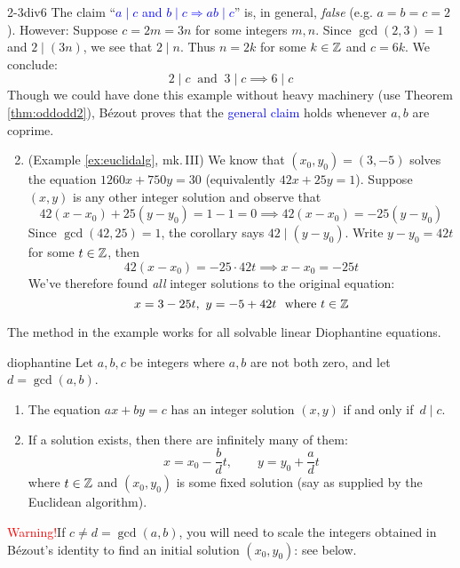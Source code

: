 \begin{examples}{}{2-3div6}
	\exstart The claim ``\textcolor{blue}{$a\mid c$ and $b\mid c\Longrightarrow ab\mid c$}'' is, in general, \emph{false} (e.g.{} $a=b=c=2$). However: Suppose $c=2m=3n$ for some integers $m,n$. Since $\gcd(2,3)=1$ and $2\mid(3n)$, we see that $2\mid n$. Thus $n=2k$ for some $k\in\mathbb{Z}$ and $c=6k$. We conclude:
	\[
		2\mid c\ \text{ and }\ 3\mid c\implies 6\mid c
	\]
	Though we could have done this example without heavy machinery (use Theorem \ref{thm:oddodd2}), Bézout proves that the \textcolor{blue}{general claim} holds whenever $a,b$ are coprime.
% 	 
	\begin{enumerate}\setcounter{enumi}{1}
	  \item (Example \ref{ex:euclidalg}, mk.\,III)
	We know that $(x_0,y_0)=(3,-5)$ solves the equation $1260x+750y=30$ (equivalently $42x+25y=1$). Suppose $(x,y)$ is any other integer solution and observe that
	\[
		42(x-x_0)+25(y-y_0)=1-1=0 \implies 42(x-x_0)=-25(y-y_0)
	\]
	Since $\gcd(42,25)=1$, the corollary says $42\mid(y-y_0)$. Write $y-y_0=42t$ for some $t\in\mathbb{Z}$, then
	\[
		42(x-x_0)=-25\cdot 42t\implies x-x_0=-25t
	\]
	We've therefore found \emph{all} integer solutions to the original equation:
	\[
		x=3-25t,\ y=-5+42t\ \text{ where }t\in\mathbb{Z}
	\]
	\end{enumerate} 
\end{examples}


\goodbreak

The method in the example works for all solvable linear Diophantine equations.

\begin{thm}{}{diophantine}
	Let $a,b,c$ be integers where $a,b$ are not both zero, and let $d=\gcd(a,b)$.
	\begin{enumerate}\itemsep0pt
	  \item The equation $ax+by=c$ has an integer solution $(x,y)$ if and only if $\,d\mid c$.
	  \item If a solution exists, then there are infinitely many of them:%
		\[
			x=x_0-\frac bd t,\qquad y=y_0+\frac ad t\tag{$\ast$}
		\]
		where $t\in\mathbb{Z}$ and $(x_0,y_0)$ is some fixed solution (say as supplied by the Euclidean algorithm).
	\end{enumerate} 
\end{thm}


\textcolor{red}{Warning!}\lstsp If $c\neq d=\gcd(a,b)$, you will need to scale the integers obtained in Bézout's identity to find an initial solution $(x_0,y_0)$: see below.

